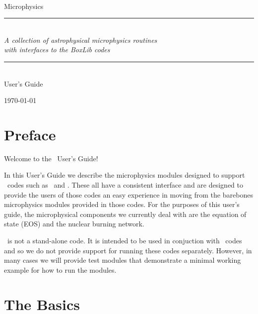 \documentclass[11pt]{book}
\newcommand{\HRule}{\rule{\linewidth}{0.125mm}}
\renewcommand{\chaptermark}[1]{%
 \markboth{\chaptername
\ \thechapter.\ #1}{}}
\begin{document}
\frontmatter

\begin{titlepage}
\begin{center}
\ \\[3in]
{\sf \Huge Microphysics} 

\begin{minipage}{5.5in}
\HRule\\[2mm]
\centering
{\Large \em A collection of astrophysical microphysics routines \\ with interfaces to the BoxLib codes}

\HRule
\end{minipage}

\ \\[1 in]
{\sf \huge User's Guide}

\vfill

{\large \today}
\end{center}

\end{titlepage}



\setcounter{tocdepth}{2}
\tableofcontents

\clearpage

\chapter*{Preface}
\chaptermark{Preface}

Welcome to the \microphysics\ User's Guide!

In this User's Guide we describe the microphysics modules designed to
support \boxlib\ codes such as \castro\ and \maestro. These all have a
consistent interface and are designed to provide the users of those
codes an easy experience in moving from the barebones microphysics
modules provided in those codes. For the purposes of this user's
guide, the microphysical components we currently deal with are the
equation of state (EOS) and the nuclear burning network.

\microphysics\ is not a stand-alone code. It is intended to be used in
conjuction with \boxlib\ codes and so we do not provide support for
running these codes separately.  However, in many cases we will
provide test modules that demonstrate a minimal working example for
how to run the modules.

\clearpage

\mainmatter


\chapter{The Basics}
\end{document}

